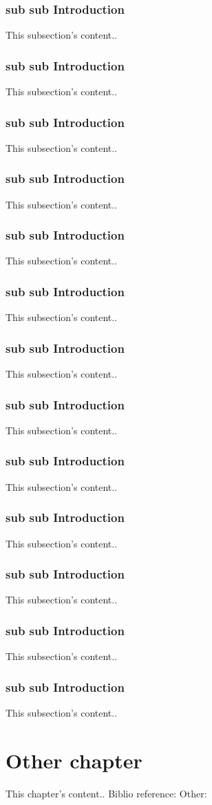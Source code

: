 \documentclass[12pt,a4paper,english]{book}
\begin{document}
\subsection{sub sub Introduction}
This subsection's content..
\subsection{sub sub Introduction}
This subsection's content..
\subsection{sub sub Introduction}
This subsection's content..
\subsection{sub sub Introduction}
This subsection's content..
\subsection{sub sub Introduction}
This subsection's content..
\subsection{sub sub Introduction}
This subsection's content..
\subsection{sub sub Introduction}
This subsection's content..
\subsection{sub sub Introduction}
This subsection's content..
\subsection{sub sub Introduction}
This subsection's content..
\subsection{sub sub Introduction}
This subsection's content..
\subsection{sub sub Introduction}
This subsection's content..
\subsection{sub sub Introduction}
This subsection's content..
\subsection{sub sub Introduction}
This subsection's content..

\chapter{Other chapter}
This chapter's content..
Biblio reference: \citet{osserman1969} Other:  \citet{choishoen1985}



\fancyhead{}
\fancyhead[LE,RO]{\slshape \rightmark}

  
\end{document}
